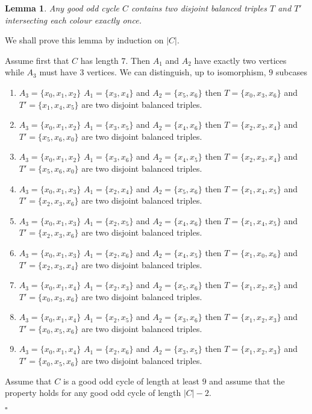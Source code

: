 \documentclass{elsart}
\theoremstyle{plain} \theoremheaderfont{\scshape}
\newtheorem{Lem}[Thm]{\bf Lemma}
\newenvironment{Prf}{{\bf \noindent Proof } }{\hfill$\square$\\}
\begin{document}
\begin{Lem}\label{Lemma:DisjointBalancedTriples}  Any good odd cycle $C$
contains two disjoint balanced triples $T$ and $T'$ intersecting
each colour exactly once.
\end{Lem}
\begin{Prf} We
shall prove this lemma by induction on $|C|$.

Assume first that $C$ has length $7$. Then $A_1$ and $A_2$ have
exactly two vertices while $A_3$ must have $3$ vertices. We can
distinguish, up to isomorphism, $9$ subcases

\begin{enumerate}
  \item $A_3=\{x_0,x_1,x_2\}$ $A_1=\{x_3,x_4\}$ and
  $A_2=\{x_5,x_6\}$ then $T=\{x_0,x_3,x_6\}$ and $T'=\{x_1,x_4,x_5\}$ are  two
  disjoint balanced triples.
  \item $A_3=\{x_0,x_1,x_2\}$ $A_1=\{x_3,x_5\}$ and
  $A_2=\{x_4,x_6\}$ then $T=\{x_2,x_3,x_4\}$ and $T'=\{x_5,x_6,x_0\}$ are  two
  disjoint balanced triples.
  \item$A_3=\{x_0,x_1,x_2\}$ $A_1=\{x_3,x_6\}$ and
  $A_2=\{x_4,x_5\}$ then $T=\{x_2,x_3,x_4\}$ and $T'=\{x_5,x_6,x_0\}$ are  two
  disjoint balanced triples.
  \item$A_3=\{x_0,x_1,x_3\}$ $A_1=\{x_2,x_4\}$ and
  $A_2=\{x_5,x_6\}$ then $T=\{x_1,x_4,x_5\}$ and $T'=\{x_2,x_3,x_6\}$ are  two
  disjoint balanced triples.
  \item$A_3=\{x_0,x_1,x_3\}$ $A_1=\{x_2,x_5\}$ and
  $A_2=\{x_4,x_6\}$ then $T=\{x_1,x_4,x_5\}$ and $T'=\{x_2,x_3,x_6\}$ are  two
  disjoint balanced triples.
  \item$A_3=\{x_0,x_1,x_3\}$ $A_1=\{x_2,x_6\}$ and
  $A_2=\{x_4,x_5\}$ then $T=\{x_1,x_0,x_6\}$ and $T'=\{x_2,x_3,x_4\}$ are  two
  disjoint balanced triples.
  \item$A_3=\{x_0,x_1,x_4\}$ $A_1=\{x_2,x_3\}$ and
  $A_2=\{x_5,x_6\}$ then $T=\{x_1,x_2,x_5\}$ and $T'=\{x_0,x_3,x_6\}$ are  two
  disjoint balanced triples.
  \item$A_3=\{x_0,x_1,x_4\}$ $A_1=\{x_2,x_5\}$ and
  $A_2=\{x_3,x_6\}$ then $T=\{x_1,x_2,x_3\}$ and $T'=\{x_0,x_5,x_6\}$ are  two
  disjoint balanced triples.
  \item$A_3=\{x_0,x_1,x_4\}$ $A_1=\{x_2,x_6\}$ and
  $A_2=\{x_3,x_5\}$ then $T=\{x_1,x_2,x_3\}$ and $T'=\{x_0,x_5,x_6\}$ are  two
  disjoint balanced triples.
\end{enumerate}

Assume that $C$ is a good odd cycle of length at least $9$ and
assume that the property holds for any good odd cycle of length
$|C|-2$.


\end{Prf}
\end{document}
